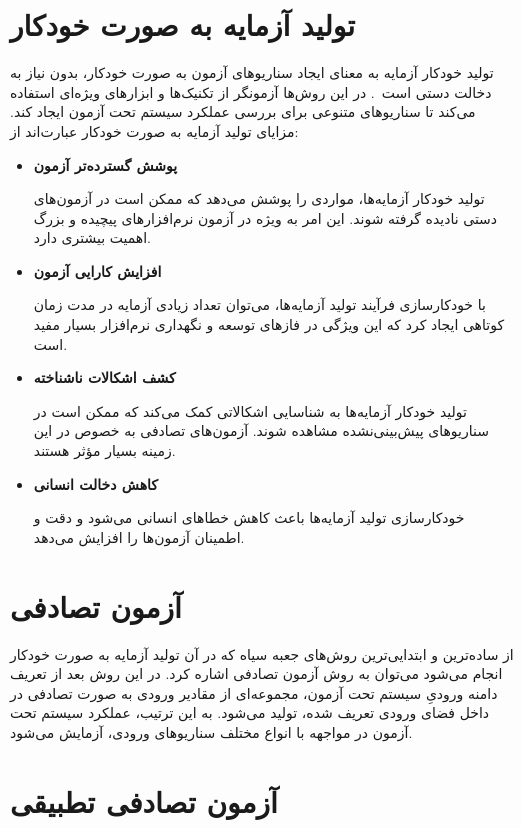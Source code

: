 \section{تولید آزمایه به صورت خودکار}
تولید خودکار آزمایه 
به معنای ایجاد سناریوهای آزمون به صورت خودکار، بدون نیاز به دخالت دستی است~\cite{shanthi2011automated}. در این روش‌ها آزمونگر از تکنیک‌ها و ابزارهای ویژه‌ای استفاده می‌کند تا سناریوهای متنوعی برای بررسی عملکرد سیستم تحت آزمون
ایجاد کند. مزایای تولید آزمایه به صورت خودکار عبارت‌اند از:
\begin{itemize}
	\item \textbf{پوشش گسترده‌تر آزمون}
	
	تولید خودکار آزمایه‌ها، مواردی را پوشش می‌دهد که ممکن است در آزمون‌های دستی نادیده گرفته شوند. این امر به ویژه در آزمون نرم‌افزارهای پیچیده و بزرگ اهمیت بیشتری دارد.
	\item \textbf{افزایش کارایی آزمون}
	
	با خودکارسازی فرآیند تولید آزمایه‌ها، می‌توان تعداد زیادی آزمایه در مدت زمان کوتاهی ایجاد کرد که این ویژگی در فازهای توسعه و نگهداری نرم‌افزار بسیار مفید است.
	\item \textbf{کشف اشکالات ناشناخته}
	
	تولید خودکار آزمایه‌ها به شناسایی اشکالاتی کمک می‌کند که ممکن است در سناریوهای پیش‌بینی‌نشده مشاهده شوند. آزمون‌های تصادفی به خصوص در این زمینه بسیار مؤثر هستند.
	\item \textbf{کاهش دخالت انسانی}
	
	خودکارسازی تولید آزمایه‌ها باعث کاهش خطاهای انسانی می‌شود و دقت و اطمینان آزمون‌ها را افزایش می‌دهد.
\end{itemize}

\section{آزمون تصادفی}

از ساده‌ترین و ابتدایی‌ترین روش‌های جعبه ‌سیاه که در آن تولید آزمایه به صورت خودکار انجام می‌شود می‌توان به روش آزمون تصادفی
\cite{hamlet1994random}
 اشاره کرد. در این روش بعد از تعریف دامنه ورودیِ سیستم تحت آزمون، مجموعه‌ای از مقادیر ورودی به صورت تصادفی در داخل فضای ورودی تعریف شده، تولید می‌شود. به این ترتیب، عملکرد سیستم تحت آزمون در مواجهه با انواع مختلف سناریوهای ورودی، آزمایش می‌شود.

\section{آزمون تصادفی تطبیقی}

